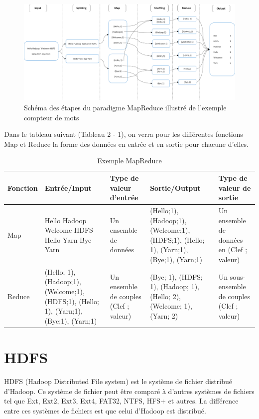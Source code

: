 \documentclass[12pt,french]{book}
\begin{document}
\begin{figure}[ht]
	\centering
	\includegraphics[width=\linewidth]{mapReduceSchema}
	\caption{Schéma des étapes du paradigme MapReduce illustré de l’exemple compteur de mots}
\end{figure}

Dans le tableau suivant (Tableau 2 - 1), on verra pour les différentes fonctions Map et Reduce la forme des données en entrée et en sortie pour chacune d’elles.

\begin{table}[H]
	\begin{tabular}{|p{1.4cm}|p{3.4cm}|p{1.5cm}|p{3.3cm}|p{2cm}|}
		\hline
		\rowcolor[HTML]{CBCEFB} 
		Fonction & Entrée/Input & Type de valeur d’entrée & Sortie/Output & Type de valeur de sortie \\
		\hline
		Map & 
		Hello Hadoop Welcome HDFS Hello Yarn Bye Yarn &
		Un ensemble de données &
		(Hello;1), (Hadoop;1), (Welcome;1), (HDFS;1), (Hello; 1), (Yarn;1), (Bye;1), (Yarn;1) &
		Un ensemble de données en (Clef ; valeur) \\
		\hline
		Reduce & 
		(Hello; 1), (Hadoop;1), (Welcome;1), (HDFS;1), (Hello; 1), (Yarn;1), (Bye;1), (Yarn;1) & 
		Un ensemble de couples (Clef ; valeur) & 
		(Bye; 1), (HDFS; 1), (Hadoop; 1), (Hello; 2), (Welcome; 1), (Yarn; 2) &
		Un sous-ensemble de couples (Clef ; valeur) \\
		\hline
	\end{tabular}
	\caption{Exemple MapReduce}
\end{table}
  
\section{HDFS}

HDFS (Hadoop Distributed File system) est le système de fichier distribué d’Hadoop.
Ce système de fichier peut être comparé à d’autres systèmes de fichiers tel que Ext, Ext2, Ext3, Ext4, FAT32, NTFS, HFS+ et autres.
La différence entre ces systèmes de fichiers est que celui d’Hadoop est distribué.
\end{document}
